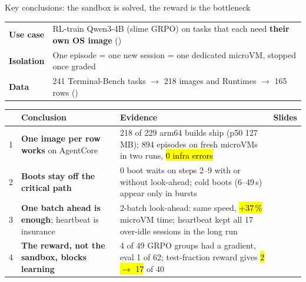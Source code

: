 \begin{frame}{Key conclusions: the sandbox is solved, the reward is the bottleneck}
\scriptsize\setlength{\tabcolsep}{4pt}
\begin{tabularx}{\textwidth}{@{}P{0.12\textwidth}Y@{}}
\toprule
\textbf{Use case} & RL-train Qwen3-4B (slime GRPO) on tasks that each need \textbf{their own OS image} ()\\
\textbf{Isolation} & One episode = one new session = one dedicated microVM, stopped once graded\\
\textbf{Data} & 241 Terminal-Bench tasks $\rightarrow$ 218 images and Runtimes $\rightarrow$ 165 rows ()\\
\bottomrule
\end{tabularx}
\par\vspace{1mm}
\scriptsize\setlength{\tabcolsep}{4pt}
\begin{tabularx}{\textwidth}{@{}P{0.03\textwidth}P{0.33\textwidth}Y P{0.1\textwidth}@{}}
\toprule
& \textbf{Conclusion} & \textbf{Evidence} & \textbf{Slides}\\
 & \textbf{One image per row works} on AgentCore & 218 of 229 arm64 builds ship (p50 127\,MB); 894 episodes on fresh microVMs in two runs, \hl{0 infra errors} & \\
2 & \textbf{Boots stay off the critical path} & 0 boot waits on steps 2--9 with or without look-ahead; cold boots (6--49\,s) appear only in bursts & \\
3 & \textbf{One batch ahead is enough}; heartbeat is insurance & 2-batch look-ahead: same speed, \hl{+37\,\%} microVM time; heartbeat kept all 17 over-idle sessions in the long run & \\
4 & \textbf{The reward, not the sandbox, blocks learning} & 4 of 49 GRPO groups had a gradient, eval 1 of 62; test-fraction reward gives \hl{2 $\rightarrow$ 17} of 40 & \\
\bottomrule
\end{tabularx}
\par\vspace{2mm}
\end{frame}


